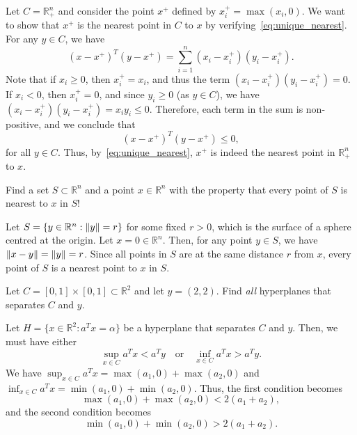 \begin{solution}
  Let $C = \mathbb{R}^n_+$ and consider the point $x^+$ defined by $x^+_i = \max(x_i, 0)$.
  We want to show that $x^+$ is the nearest point in $C$ to $x$ by verifying~\eqref{eq:unique_nearest}.
  For any $y \in C$, we have
  \begin{equation}
    (x - x^+)^T (y - x^+) = \sum_{i=1}^n (x_i - x^+_i)(y_i - x^+_i).
  \end{equation}
  Note that if $x_i \geq 0$, then $x^+_i = x_i$, and thus the term $(x_i - x^+_i)(y_i - x^+_i) = 0$.
  If $x_i < 0$, then $x^+_i = 0$, and since $y_i \geq 0$ (as $y \in C$), we have $(x_i - x^+_i)(y_i - x^+_i) = x_i y_i \leq 0$.
  Therefore, each term in the sum is non-positive, and we conclude that
  \begin{equation}
    (x - x^+)^T (y - x^+) \leq 0,
  \end{equation}
  for all $y \in C$.
  Thus, by~\eqref{eq:unique_nearest}, $x^+$ is indeed the nearest point in $\mathbb{R}^n_+$ to $x$.
\end{solution}

\begin{exercise}
  Find a set $S \subset \mathbb{R}^n$ and a point $x \in \mathbb{R}^n$ with the property that every point of $S$ is nearest to $x$ in $S$!
\end{exercise}

\begin{solution}
  Let $S = \{ y \in \mathbb{R}^n : \lVert y\rVert = r \}$ for some fixed $r > 0$, which is the surface of a sphere centred at the origin.
  Let $x = 0 \in \mathbb{R}^n$.
  Then, for any point $y \in S$, we have $\lVert x - y\rVert = \lVert y\rVert = r$.
  Since all points in $S$ are at the same distance $r$ from $x$, every point of $S$ is a nearest point to $x$ in $S$.
\end{solution}


\begin{exercise}
  Let $C = [0,1] \times [0,1] \subset \mathbb{R}^2$ and let $y = (2,2)$.
  Find \emph{all} hyperplanes that separates $C$ and $y$.
\end{exercise}

\begin{solution}
  Let $H = \{ x \in \mathbb{R}^2 : a^T x = \alpha \}$ be a hyperplane that separates $C$ and $y$.
  Then, we must have either
  \begin{equation}
    \sup_{x \in C} a^T x < a^T y
    \quad\text{or}\quad
    \inf_{x \in C} a^T x > a^T y.
  \end{equation}
  We have $\sup_{x \in C} a^T x = \max(a_1, 0) + \max(a_2, 0)$ and $\inf_{x \in C} a^T x = \min(a_1, 0) + \min(a_2, 0)$.
  Thus, the first condition becomes
  \begin{equation}
    \max(a_1, 0) + \max(a_2, 0) < 2 (a_1 + a_2),
  \end{equation}
  and the second condition becomes
  \begin{equation}
    \min(a_1, 0) + \min(a_2, 0) > 2 (a_1 + a_2).
  \end{equation}
\end{solution}